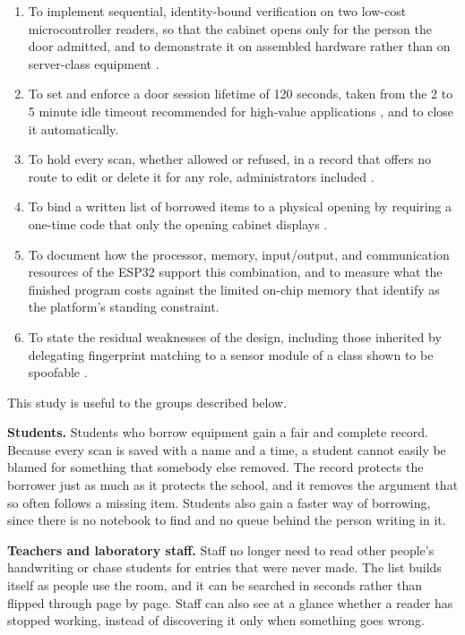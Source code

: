 \begin{enumerate}
  \item To implement sequential, identity-bound verification on two low-cost
        microcontroller readers, so that the cabinet opens only for the person
        the door admitted, and to demonstrate it on assembled hardware rather
        than on server-class equipment \parencite{mohammed2025}.
  \item To set and enforce a door session lifetime of 120 seconds, taken from
        the 2 to 5 minute idle timeout recommended for high-value applications
        \parencite{owasp2026}, and to close it automatically.
  \item To hold every scan, whether allowed or refused, in a record that offers
        no route to edit or delete it for any role, administrators included
        \parencite{koisser2023}.
  \item To bind a written list of borrowed items to a physical opening by
        requiring a one-time code that only the opening cabinet displays
        \parencite{cepeda2025}.
  \item To document how the processor, memory, input/output, and communication
        resources of the ESP32 support this combination, and to measure what the
        finished program costs against the limited on-chip memory that
        \textcite{rahman2026} identify as the platform's standing constraint.
  \item To state the residual weaknesses of the design, including those
        inherited by delegating fingerprint matching to a sensor module of a
        class shown to be spoofable \parencite{rad2024}.
\end{enumerate}


This study is useful to the groups described below.

\textbf{Students.} Students who borrow equipment gain a fair and complete
record. Because every scan is saved with a name and a time, a student cannot
easily be blamed for something that somebody else removed. The record protects
the borrower just as much as it protects the school, and it removes the argument
that so often follows a missing item. Students also gain a faster way of
borrowing, since there is no notebook to find and no queue behind the person
writing in it.

\textbf{Teachers and laboratory staff.} Staff no longer need to read other
people's handwriting or chase students for entries that were never made. The
list builds itself as people use the room, and it can be searched in seconds
rather than flipped through page by page. Staff can also see at a glance whether
a reader has stopped working, instead of discovering it only when something goes
wrong.

